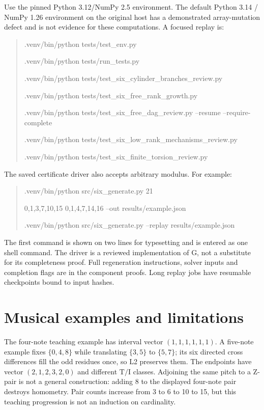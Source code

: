 \documentclass[11pt]{article}
\theoremstyle{remark}
\newcommand{\TI}{\mathrm{T/I}}
\begin{document}
Use the pinned Python 3.12/NumPy 2.5 environment. The default Python 3.14 /
NumPy 1.26 environment on the original host has a demonstrated array-mutation
defect and is not evidence for these computations. A focused replay is:
\begin{quote}\small\ttfamily
.venv/bin/python tests/test\_env.py\par
.venv/bin/python tests/run\_tests.py\par
.venv/bin/python tests/test\_six\_cylinder\_branches\_review.py\par
.venv/bin/python tests/test\_six\_free\_rank\_growth.py\par
.venv/bin/python tests/test\_six\_free\_dag\_review.py --resume --require-complete\par
.venv/bin/python tests/test\_six\_low\_rank\_mechanisms\_review.py\par
.venv/bin/python tests/test\_six\_finite\_torsion\_review.py
\end{quote}
The saved certificate driver also accepts arbitrary modulus. For example:
\begin{quote}\small\ttfamily
.venv/bin/python src/six\_generate.py 21\par
\hspace*{1em}0,1,3,7,10,15 0,1,4,7,14,16 --out results/example.json\par
.venv/bin/python src/six\_generate.py --replay results/example.json
\end{quote}
The first command is shown on two lines for typesetting and is entered as
one shell command. The driver is a reviewed implementation of G, not a
substitute for its completeness proof. Full regeneration instructions,
solver inputs and completion flags are in the component proofs. Long replay
jobs have resumable checkpoints bound to input hashes.

\section{Musical examples and limitations}\label{sec:trust}
The four-note teaching example has interval vector $(1,1,1,1,1,1)$.
A five-note example fixes $\{0,4,8\}$ while translating $\{3,5\}$ to
$\{5,7\}$; its six directed cross differences fill the odd residues once,
so L2 preserves them. The endpoints have vector $(2,1,2,3,2,0)$ and
different $\TI$ classes. Adjoining the same pitch to a Z-pair is not a
general construction: adding 8 to the displayed four-note pair destroys
homometry. Pair counts increase from 3 to 6 to 10 to 15, but this teaching
progression is not an induction on cardinality.
\end{document}
